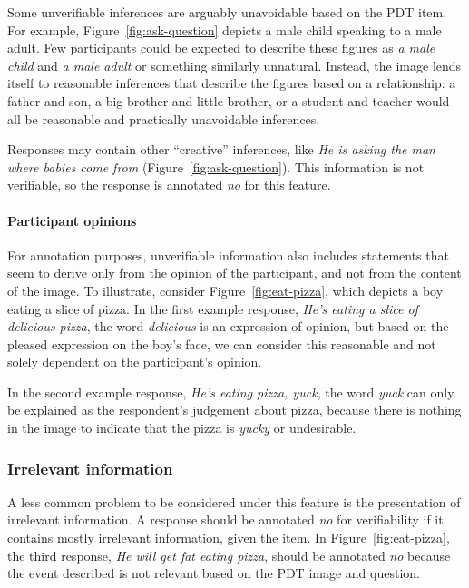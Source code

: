 \documentclass[12pt]{article}
\begin{document}
Some unverifiable inferences are arguably unavoidable based on the PDT item. For example, Figure~\ref{fig:ask-question} depicts a male child speaking to a male adult. Few participants could be expected to describe these figures as \textit{a male child} and \textit{a male adult} or something similarly unnatural. Instead, the image lends itself to reasonable inferences that describe the figures based on a relationship: a father and son, a big brother and little brother, or a student and teacher would all be reasonable and practically unavoidable inferences. 

Responses may contain other ``creative'' inferences, like \textit{He is asking the man where babies come from} (Figure~\ref{fig:ask-question}). This information is not verifiable, so the response is annotated \textit{no} for this feature.

\paragraph{Participant opinions} For annotation purposes, unverifiable information also includes statements that seem to derive only from the opinion of the participant, and not from the content of the image. To illustrate, consider Figure~\ref{fig:eat-pizza}, which depicts a boy eating a slice of pizza. In the first example response, \textit{He's eating a slice of delicious pizza}, the word \textit{delicious} is an expression of opinion, but based on the pleased expression on the boy's face, we can consider this reasonable and not solely dependent on the participant's opinion.

In the second example response, \textit{He's eating pizza, yuck}, the word \textit{yuck} can only be explained as the respondent's judgement about pizza, because there is nothing in the image to indicate that the pizza is \textit{yucky} or undesirable. 

\subsubsection{Irrelevant information} 
A less common problem to be considered under this feature is the presentation of irrelevant information. A response should be annotated \textit{no} for verifiability if it contains mostly irrelevant information, given the item. In Figure~\ref{fig:eat-pizza}, the third response, \textit{He will get fat eating pizza}, should be annotated \textit{no} because the event described is not relevant based on the PDT image and question.
\end{document}
